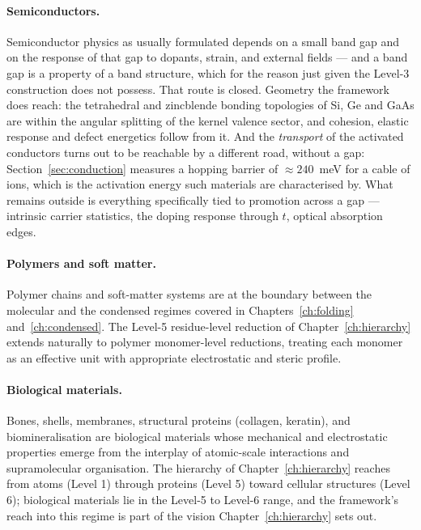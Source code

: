 \paragraph{Semiconductors.}
Semiconductor physics as usually formulated depends on a small band gap and on the response of that gap to dopants, strain, and external fields --- and a band gap is a property of a band structure, which for the reason just given the Level-3 construction does not possess. That route is closed. Geometry the framework does reach: the tetrahedral and zincblende bonding topologies of Si, Ge and GaAs are within the angular splitting of the kernel valence sector, and cohesion, elastic response and defect energetics follow from it. And the \emph{transport} of the activated conductors turns out to be reachable by a different road, without a gap: Section~\ref{sec:conduction} measures a hopping barrier of ${\approx}240$~meV for a cable of ions, which is the activation energy such materials are characterised by. What remains outside is everything specifically tied to promotion across a gap --- intrinsic carrier statistics, the doping response through $t$, optical absorption edges.

\paragraph{Polymers and soft matter.}
Polymer chains and soft-matter systems are at the boundary between the molecular and the condensed regimes covered in Chapters~\ref{ch:folding} and~\ref{ch:condensed}. The Level-5 residue-level reduction of Chapter~\ref{ch:hierarchy} extends naturally to polymer monomer-level reductions, treating each monomer as an effective unit with appropriate electrostatic and steric profile.

\paragraph{Biological materials.}
Bones, shells, membranes, structural proteins (collagen, keratin), and biomineralisation are biological materials whose mechanical and electrostatic properties emerge from the interplay of atomic-scale interactions and supramolecular organisation. The hierarchy of Chapter~\ref{ch:hierarchy} reaches from atoms (Level 1) through proteins (Level 5) toward cellular structures (Level 6); biological materials lie in the Level-5 to Level-6 range, and the framework's reach into this regime is part of the vision Chapter~\ref{ch:hierarchy} sets out.

